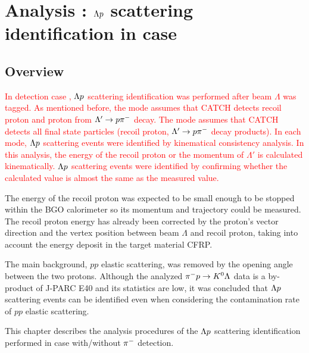%

\graphicspath{{./pictures/chapter_Lp_2p}}

\chapter{Analysis : $\Lambda p$ scattering identification in case } 
\label{chap-Lp_2p}

\section{Overview}
\textcolor{red}{ In detection case , $\Lambda p$ scattering identification was performed after beam $\Lambda$ was tagged. As mentioned before, the  mode assumes that CATCH detects recoil proton and proton from $\Lambda'\to p\pi^{-}$ decay. The  mode assumes that CATCH detects all final state particles (recoil proton, $\Lambda'\to p\pi^{-}$ decay products). In each mode, $\Lambda p$ scattering events were identified by kinematical consistency analysis. In this analysis, the energy of the recoil proton or the momentum of $\Lambda'$ is calculated kinematically. $\Lambda p$ scattering events were identified by confirming whether the calculated value is almost the same as the measured value. }

The energy of the recoil proton was expected to be small enough to be stopped within the BGO calorimeter so its momentum and trajectory could be measured. The recoil proton energy has already been corrected by the proton's vector direction and the vertex position between beam $\Lambda$ and recoil proton, taking into account the energy deposit in the target material CFRP.

The main background, $pp$ elastic scattering, was removed by the opening angle between the two protons. Although the analyzed $\pi^- p \to K^0 \Lambda$ data is a by-product of J-PARC E40 and its statistics are low, it was concluded that $\Lambda p$ scattering events can be identified even when considering the contamination rate of $pp$ elastic scattering.

This chapter describes the analysis procedures of the $\Lambda p$ scattering identification performed in case  with/without $\pi^{-}$ detection.


